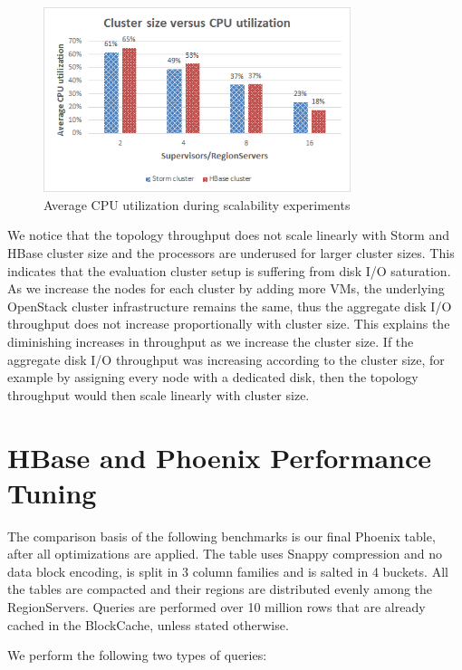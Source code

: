 \begin{figure}[H]
\centering
\includegraphics[width=0.8\textwidth]{figures/benchmarks_storm_scalability_cpu}
\caption{Average CPU utilization during scalability experiments}
\label{figure:benchmarks_storm_scalability_cpu}
\end{figure}

We notice that the topology throughput does not scale linearly with Storm and HBase cluster size and the processors are underused for larger cluster sizes. This indicates that the evaluation cluster setup is suffering from disk I/O saturation. As we increase the nodes for each cluster by adding more VMs, the underlying OpenStack cluster infrastructure remains the same, thus the aggregate disk I/O throughput does not increase proportionally with cluster size. This explains the diminishing increases in throughput as we increase the cluster size. If the aggregate disk I/O throughput was increasing according to the cluster size, for example by assigning every node with a dedicated disk, then the topology throughput would then scale linearly with cluster size.


\section{HBase and Phoenix Performance Tuning}

The comparison basis of the following benchmarks is our final Phoenix table, after all optimizations are applied. The table uses Snappy compression and no data block encoding, is split in 3 column families and is salted in 4 buckets. All the tables are compacted and their regions are distributed evenly among the RegionServers. Queries are performed over 10 million rows that are already cached in the BlockCache, unless stated otherwise.

We perform the following two types of queries:

